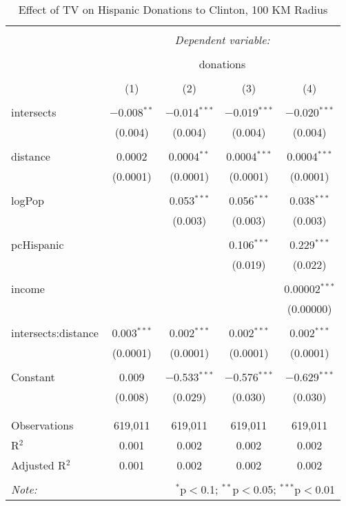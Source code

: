 
\begin{table}[!htbp] \centering 
  \caption{Effect of TV on Hispanic Donations to Clinton, 100 KM Radius} 
  \label{} 
\begin{tabular}{@{\extracolsep{-5pt}}lcccc} 
\\[-1.8ex]\hline 
\hline \\[-1.8ex] 
 & \multicolumn{4}{c}{\textit{Dependent variable:}} \\ 
\cline{2-5} 
\\[-1.8ex] & \multicolumn{4}{c}{donations} \\ 
\\[-1.8ex] & (1) & (2) & (3) & (4)\\ 
\hline \\[-1.8ex] 
 intersects & $-$0.008$^{**}$ & $-$0.014$^{***}$ & $-$0.019$^{***}$ & $-$0.020$^{***}$ \\ 
  & (0.004) & (0.004) & (0.004) & (0.004) \\ 
  & & & & \\ 
 distance & 0.0002 & 0.0004$^{**}$ & 0.0004$^{***}$ & 0.0004$^{***}$ \\ 
  & (0.0001) & (0.0001) & (0.0001) & (0.0001) \\ 
  & & & & \\ 
 logPop &  & 0.053$^{***}$ & 0.056$^{***}$ & 0.038$^{***}$ \\ 
  &  & (0.003) & (0.003) & (0.003) \\ 
  & & & & \\ 
 pcHispanic &  &  & 0.106$^{***}$ & 0.229$^{***}$ \\ 
  &  &  & (0.019) & (0.022) \\ 
  & & & & \\ 
 income &  &  &  & 0.00002$^{***}$ \\ 
  &  &  &  & (0.00000) \\ 
  & & & & \\ 
 intersects:distance & 0.003$^{***}$ & 0.002$^{***}$ & 0.002$^{***}$ & 0.002$^{***}$ \\ 
  & (0.0001) & (0.0001) & (0.0001) & (0.0001) \\ 
  & & & & \\ 
 Constant & 0.009 & $-$0.533$^{***}$ & $-$0.576$^{***}$ & $-$0.629$^{***}$ \\ 
  & (0.008) & (0.029) & (0.030) & (0.030) \\ 
  & & & & \\ 
\hline \\[-1.8ex] 
Observations & 619,011 & 619,011 & 619,011 & 619,011 \\ 
R$^{2}$ & 0.001 & 0.002 & 0.002 & 0.002 \\ 
Adjusted R$^{2}$ & 0.001 & 0.002 & 0.002 & 0.002 \\ 
\hline 
\hline \\[-1.8ex] 
\textit{Note:}  & \multicolumn{4}{r}{$^{*}$p$<$0.1; $^{**}$p$<$0.05; $^{***}$p$<$0.01} \\ 
\end{tabular} 
\end{table} 
